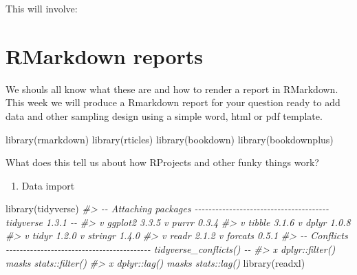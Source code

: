 \documentclass[
]{book}
\newenvironment{Shaded}{\begin{snugshade}}{\end{snugshade}}
\newcommand{\CommentTok}[1]{\textcolor[rgb]{0.56,0.35,0.01}{\textit{#1}}}
\newcommand{\FunctionTok}[1]{\textcolor[rgb]{0.00,0.00,0.00}{#1}}
\newcommand{\NormalTok}[1]{#1}
\providecommand{\tightlist}{%
  \setlength{\itemsep}{0pt}\setlength{\parskip}{0pt}}
\begin{document}
This will involve:

\hypertarget{rmarkdown-reports}{%
\section{RMarkdown reports}\label{rmarkdown-reports}}

We shouls all know what these are and how to render a report in RMarkdown. This week we will produce a Rmarkdown report for your question ready to add data and other sampling design using a simple word, html or pdf template.

\begin{Shaded}
\begin{Highlighting}[]
\FunctionTok{library}\NormalTok{(rmarkdown)}
\FunctionTok{library}\NormalTok{(rticles)}
\FunctionTok{library}\NormalTok{(bookdown)}
\FunctionTok{library}\NormalTok{(bookdownplus)}
\end{Highlighting}
\end{Shaded}

What does this tell us about how RProjects and other funky things work?

\begin{enumerate}
\def\labelenumi{\arabic{enumi}.}
\setcounter{enumi}{2}
\tightlist
\item
  Data import
\end{enumerate}

\begin{Shaded}
\begin{Highlighting}[]
\FunctionTok{library}\NormalTok{(tidyverse)}
\CommentTok{\#\textgreater{} {-}{-} Attaching packages {-}{-}{-}{-}{-}{-}{-}{-}{-}{-}{-}{-}{-}{-}{-}{-}{-}{-}{-}{-}{-}{-}{-}{-}{-}{-}{-}{-}{-}{-}{-}{-}{-}{-}{-}{-}{-}{-}{-} tidyverse 1.3.1 {-}{-}}
\CommentTok{\#\textgreater{} v ggplot2 3.3.5     v purrr   0.3.4}
\CommentTok{\#\textgreater{} v tibble  3.1.6     v dplyr   1.0.8}
\CommentTok{\#\textgreater{} v tidyr   1.2.0     v stringr 1.4.0}
\CommentTok{\#\textgreater{} v readr   2.1.2     v forcats 0.5.1}
\CommentTok{\#\textgreater{} {-}{-} Conflicts {-}{-}{-}{-}{-}{-}{-}{-}{-}{-}{-}{-}{-}{-}{-}{-}{-}{-}{-}{-}{-}{-}{-}{-}{-}{-}{-}{-}{-}{-}{-}{-}{-}{-}{-}{-}{-}{-}{-}{-}{-}{-} tidyverse\_conflicts() {-}{-}}
\CommentTok{\#\textgreater{} x dplyr::filter() masks stats::filter()}
\CommentTok{\#\textgreater{} x dplyr::lag()    masks stats::lag()}
\FunctionTok{library}\NormalTok{(readxl)}
\end{Highlighting}
\end{Shaded}
\end{document}
